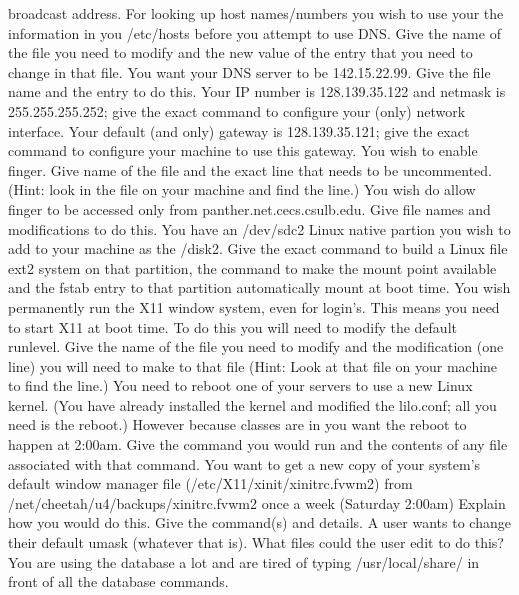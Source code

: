 broadcast address.
\vskip 1.0in
For looking up host names/numbers you wish to use your the information
in you {\ltt{}/etc/hosts} before you attempt to use DNS.
Give the name of the file you need to modify and the new value of the
entry that you need to change in that file.
\vskip 0.6in
You want your DNS server to be {\ltt{}142.15.22.99}.
Give the file name and the entry to do this.
\vskip 0.4in
\ques
Your IP number is {\ltt{}128.139.35.122} and netmask is {\ltt{}255.255.255.252};
give the exact command to configure your (only) network interface.
\vskip 0.4in
Your default (and only) gateway is {\ltt{}128.139.35.121};
give the exact command to configure your machine to use this gateway.
\vskip 0.4in
You wish to enable {\ltt{}finger}.
Give name of the file and the exact line that needs to be uncommented.
(Hint: look in the file on your machine and find the line.)
\vskip 0.4in
You wish do allow {\ltt{}finger} to be accessed only from
{\ltt{}panther.net.cecs.csulb.edu}.
Give file names and modifications to do this.
\vskip 1.4in
\vfill\eject
\ques
You have an {\ltt{}/dev/sdc2} Linux native partion you wish to add to
your machine as the {\ltt{}/disk2}. 
Give the exact command to build a Linux file ext2 system on that partition,
the command to make the mount point available and the
{\ltt{}fstab} entry to that partition automatically mount at boot time.
\vskip 1.3in
\ques
You wish permanently run the X11 window system, even for login's.
This means you need to start X11 at boot time.
To do this you will need to modify the default runlevel.
Give the name of the file you need to modify and the modification (one line)
you will need to make to that file
(Hint: Look at that file on your machine to find the line.)
\vskip 0.6in
You need to reboot one of your servers to use a new Linux kernel.
(You have already installed the kernel and modified the {\ltt{}lilo.conf};
all you need is the reboot.)
However because classes are in you want the reboot to happen at 2:00am.
Give the command you would run and the contents of any file associated with
that command.
\vskip 0.6in
You want to get a new copy of your system's default window manager file
({\ltt{}/etc/X11/xinit/xinitrc.fvwm2}) from 
{\ltt{}/net/cheetah/u4/backups/xinitrc.fvwm2}
once a week (Saturday 2:00am)
Explain how you would do this. Give the command(s) and details.
\vskip 0.8in
\ques
A user wants to change their default umask (whatever that is).
What files could the user edit to do this?
\vskip 0.9in
You are using the database a lot and are tired of typing
{\ltt{}/usr/local/share/} in front of all the database commands.
